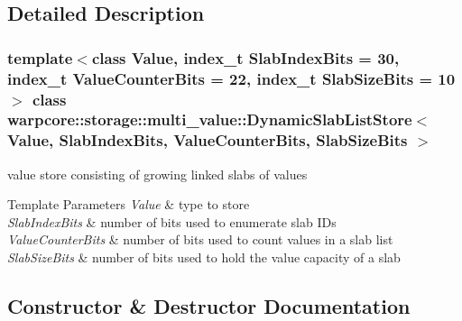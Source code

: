 \subsection{Detailed Description}
\subsubsection*{template$<$class Value, index\+\_\+t Slab\+Index\+Bits = 30, index\+\_\+t Value\+Counter\+Bits = 22, index\+\_\+t Slab\+Size\+Bits = 10$>$\newline
class warpcore\+::storage\+::multi\+\_\+value\+::\+Dynamic\+Slab\+List\+Store$<$ Value, Slab\+Index\+Bits, Value\+Counter\+Bits, Slab\+Size\+Bits $>$}

value store consisting of growing linked slabs of values 


\begin{DoxyTemplParams}{Template Parameters}
{\em Value} & type to store \\
\hline
{\em Slab\+Index\+Bits} & number of bits used to enumerate slab I\+Ds \\
\hline
{\em Value\+Counter\+Bits} & number of bits used to count values in a slab list \\
\hline
{\em Slab\+Size\+Bits} & number of bits used to hold the value capacity of a slab \\
\hline
\end{DoxyTemplParams}


\subsection{Constructor \& Destructor Documentation}
\mbox{\label{classwarpcore_1_1storage_1_1multi__value_1_1DynamicSlabListStore_ab0c3eb9a8eaef07da0eb5d7d3c5f026a}} 
